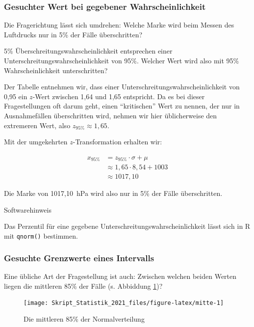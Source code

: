 \documentclass[
  11pt,
  ngerman,
  a4paper,
]{report}
\begin{document}
\hypertarget{gesuchter-wert-bei-gegebener-wahrscheinlichkeit}{%
\subsubsection{Gesuchter Wert bei gegebener Wahrscheinlichkeit}\label{gesuchter-wert-bei-gegebener-wahrscheinlichkeit}}

Die Fragerichtung lässt sich umdrehen: Welche Marke wird beim Messen des Luftdrucks nur in 5\% der Fälle überschritten?

5\% Überschreitungswahrscheinlichkeit entsprechen einer Unterschreitungswahrscheinlichkeit von 95\%. Welcher Wert wird also mit 95\% Wahrscheinlichkeit unterschritten?

Der Tabelle entnehmen wir, dass einer Unterschreitungswahrscheinlichkeit von 0,95 ein \(z\)-Wert zwischen 1,64 und 1,65 entspricht. Da es bei dieser Fragestellungen oft darum geht, einen \enquote{kritischen} Wert zu nennen, der nur in Ausnahmefällen überschritten wird, nehmen wir hier üblicherweise den extremeren Wert, also \(z_{95\%}\approx 1,65\).

Mit der umgekehrten \(z\)-Transformation erhalten wir:

\[
  \begin{aligned}
    x_{95\%}&=z_{95\%}\cdot \sigma + \mu \\
       &\approx 1{,}65\cdot 8{,}54 + 1003\\
       &\approx 1017{,}10
  \end{aligned}
\]

Die Marke von 1017,10~hPa wird also nur in 5\% der Fälle überschritten.

Softwarehinweis

Das Perzentil für eine gegebene Unterschreitungswahrscheinlichkeit lässt sich in R mit \texttt{qnorm()} bestimmen.

\hypertarget{gesuchte-grenzwerte-eines-intervalls}{%
\subsubsection{Gesuchte Grenzwerte eines Intervalls}\label{gesuchte-grenzwerte-eines-intervalls}}

Eine übliche Art der Fragestellung ist auch: Zwischen welchen beiden Werten liegen die mittleren 85\% der Fälle (s. Abbiddung \ref{fig:mitte})?

\begin{figure}[!h]

{\centering \texttt{[image: Skript\_Statistik\_2021\_files/figure-latex/mitte-1]} 

}

\caption{Die mittleren 85\% der Normalverteilung}\label{fig:mitte}
\end{figure}
\end{document}
